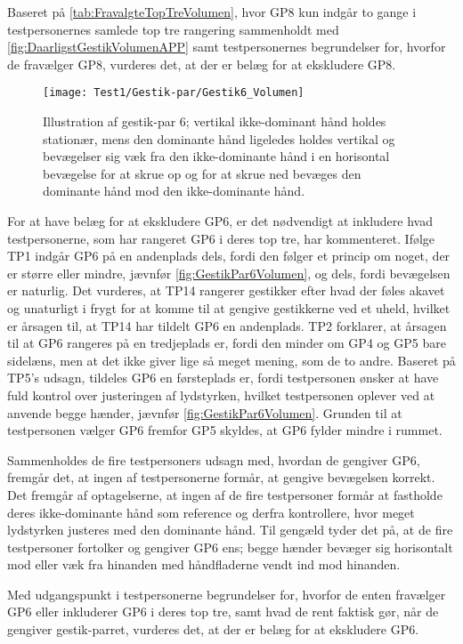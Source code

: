 %
Baseret på \autoref{tab:FravalgteTopTreVolumen}, hvor GP8 kun indgår to gange i testpersonernes samlede top tre rangering sammenholdt med \autoref{fig:DaarligstGestikVolumenAPP} samt testpersonernes begrundelser for, hvorfor de fravælger GP8, vurderes det, at der er belæg for at ekskludere GP8. 
%
\begin{figure}[H]
	\centering
	\texttt{[image: Test1/Gestik-par/Gestik6\_Volumen]}
	\caption{Illustration af gestik-par 6; vertikal ikke-dominant hånd holdes stationær, mens den dominante hånd ligeledes holdes vertikal og bevægelser sig væk fra den ikke-dominante hånd i en horisontal bevægelse for at skrue op og for at skrue ned bevæges den dominante hånd mod den ikke-dominante hånd.}
	\label{fig:GestikPar6Volumen}
\end{figure}
\noindent
% 
For at have belæg for at ekskludere GP6, er det nødvendigt at inkludere hvad testpersonerne, som har rangeret GP6 i deres top tre, har kommenteret. Ifølge TP1 indgår GP6 på en andenplads dels, fordi den følger et princip om noget, der er større eller mindre, jævnfør \autoref{fig:GestikPar6Volumen}, og dels, fordi bevægelsen er naturlig. Det vurderes, at TP14 rangerer gestikker efter hvad der føles akavet og unaturligt i frygt for at komme til at gengive gestikkerne ved et uheld, hvilket er årsagen til, at TP14 har tildelt GP6 en andenplads. TP2 forklarer, at årsagen til at GP6 rangeres på en tredjeplads er, fordi den minder om GP4 og GP5 bare sidelæns, men at det ikke giver lige så meget mening, som de to andre. Baseret på TP5's udsagn, tildeles GP6 en førsteplads er, fordi testpersonen ønsker at have fuld kontrol over justeringen af lydstyrken, hvilket testpersonen oplever ved at anvende begge hænder, jævnfør \autoref{fig:GestikPar6Volumen}. Grunden til at testpersonen vælger GP6 fremfor GP5 skyldes, at GP6 fylder mindre i rummet. 

Sammenholdes de fire testpersoners udsagn med, hvordan de gengiver GP6, fremgår det, at ingen af testpersonerne formår, at gengive bevægelsen korrekt. Det fremgår af optagelserne, at ingen af de fire testpersoner formår at fastholde deres ikke-dominante hånd som reference og derfra kontrollere, hvor meget lydstyrken justeres med den dominante hånd. Til gengæld tyder det på, at de fire testpersoner fortolker og gengiver GP6 ens; begge hænder bevæger sig horisontalt mod eller væk fra hinanden med håndfladerne vendt ind mod hinanden. 

Med udgangspunkt i testpersonerne begrundelser for, hvorfor de enten fravælger GP6 eller inkluderer GP6 i deres top tre, samt hvad de rent faktisk gør, når de gengiver gestik-parret, vurderes det, at der er belæg for at ekskludere GP6. 
